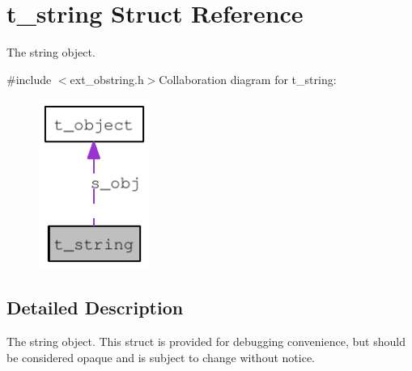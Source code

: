 \hypertarget{structt__string}{
\section{t\_\-string Struct Reference}
\label{structt__string}
}


The string object.  


{\ttfamily \#include $<$ext\_\-obstring.h$>$}Collaboration diagram for t\_\-string:\nopagebreak
\begin{figure}[H]
\begin{center}
\leavevmode
\includegraphics[width=102pt]{structt__string__coll__graph}
\end{center}
\end{figure}


\subsection{Detailed Description}
The string object. This struct is provided for debugging convenience, but should be considered opaque and is subject to change without notice. 